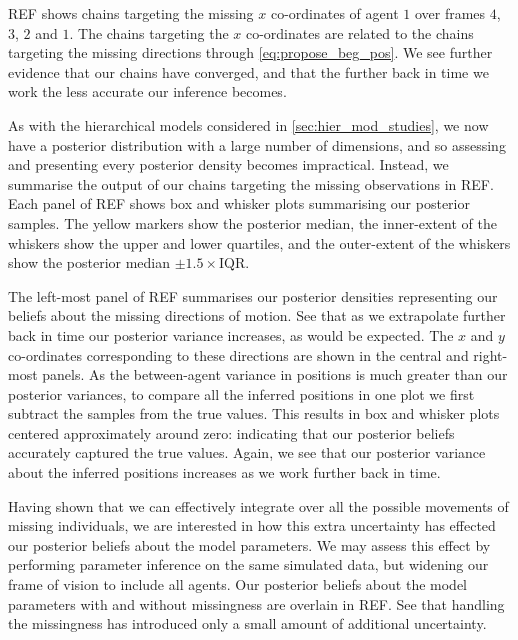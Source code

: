REF shows chains targeting the missing $x$ co-ordinates of agent $1$ over frames 
$4$, $3$, $2$ and $1$. The chains targeting the $x$ co-ordinates are related to
the chains targeting the missing directions through \cref{eq:propose_beg_pos}.
We see further evidence that our chains have converged, and that the further
back in time we work the less accurate our inference becomes.

As with the hierarchical models considered in \cref{sec:hier_mod_studies}, we
now have a posterior distribution with a large number of dimensions, and so
assessing and presenting every posterior density becomes impractical. Instead,
we summarise the output of our chains targeting the missing observations in
REF. Each panel of REF shows box and whisker plots summarising our posterior
samples. The yellow markers show the posterior median, the inner-extent of the
whiskers show the upper and lower quartiles, and the outer-extent of the
whiskers show the posterior median $\pm1.5\times\text{IQR}$.

The left-most panel of REF summarises our posterior densities representing our
beliefs about the missing directions of motion. See that as we extrapolate
further back in time our posterior variance increases, as would be expected.
The $x$ and $y$ co-ordinates corresponding to these directions are shown in the
central and right-most panels. As the between-agent variance in positions is
much greater than our posterior variances, to compare all the inferred
positions in one plot we first subtract the samples from the true values. This
results in box and whisker plots centered approximately around zero:
indicating that our posterior beliefs accurately captured the true values.
Again, we see that our posterior variance about the inferred positions
increases as we work further back in time.

Having shown that we can effectively integrate over all the possible movements
of missing individuals, we are interested in how this extra uncertainty has
effected our posterior beliefs about the model parameters. We may assess this
effect by performing parameter inference on the same simulated data, but
widening our frame of vision to include all agents. Our posterior beliefs about
the model parameters with and without missingness are overlain in REF. See that
handling the missingness has introduced only a small amount of additional
uncertainty. 

%
%
%

